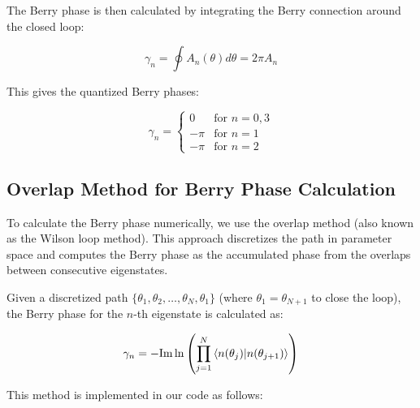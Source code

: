 \documentclass[12pt,a4paper]{article}
\begin{document}
The Berry phase is then calculated by integrating the Berry connection around the closed loop:

\begin{equation}
\gamma_n = \oint A_n(\theta) d\theta = 2\pi A_n
\end{equation}

This gives the quantized Berry phases:

\begin{equation}
\gamma_n = \begin{cases}
0 & \text{for } n = 0, 3 \\
-\pi & \text{for } n = 1 \\
-\pi & \text{for } n = 2
\end{cases}
\end{equation}

\subsection{Overlap Method for Berry Phase Calculation}

To calculate the Berry phase numerically, we use the overlap method (also known as the Wilson loop method). This approach discretizes the path in parameter space and computes the Berry phase as the accumulated phase from the overlaps between consecutive eigenstates.

Given a discretized path $\{\theta_1, \theta_2, \ldots, \theta_N, \theta_1\}$ (where $\theta_1 = \theta_{N+1}$ to close the loop), the Berry phase for the $n$-th eigenstate is calculated as:

\begin{equation}
\gamma_n = -\text{Im}\ln\left(\prod_{j=1}^{N} \braket{n(\theta_j)|n(\theta_{j+1})}\right)
\end{equation}

This method is implemented in our code as follows:
\end{document}
